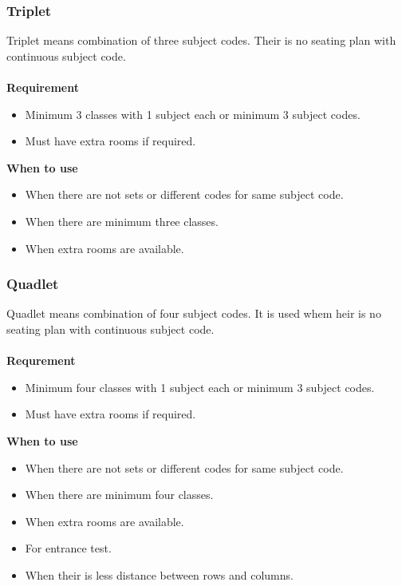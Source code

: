 

\subsubsection{Triplet}
Triplet means combination of three subject codes. Their is no seating plan
with continuous subject code.\\ \\
{\bf Requirement}
\begin{itemize}
\item Minimum 3 classes with 1 subject each or minimum 3 subject
codes.
\item Must have extra rooms if required.
\end{itemize}
{\bf When to use}
\begin{itemize}
\item When there are not sets or different codes for same subject
code.
\item When there are minimum three classes.
\item When extra rooms are available.
\end{itemize}



\subsubsection{Quadlet}
Quadlet means combination of four subject codes. It is used whem heir 
is no seating plan with continuous subject code.\\ \\
{\bf Requrement}
\begin{itemize}
\item Minimum four classes with 1 subject each or minimum 3 subject
codes.
\item Must have extra rooms if required.
\end{itemize}
{\bf When to use}
\begin{itemize}
\item When there are not sets or different codes for same subject
code.
\item When there are minimum four classes.
\item When extra rooms are available.
\item For entrance test.
\item When their is less distance between rows and columns.
\end{itemize}

